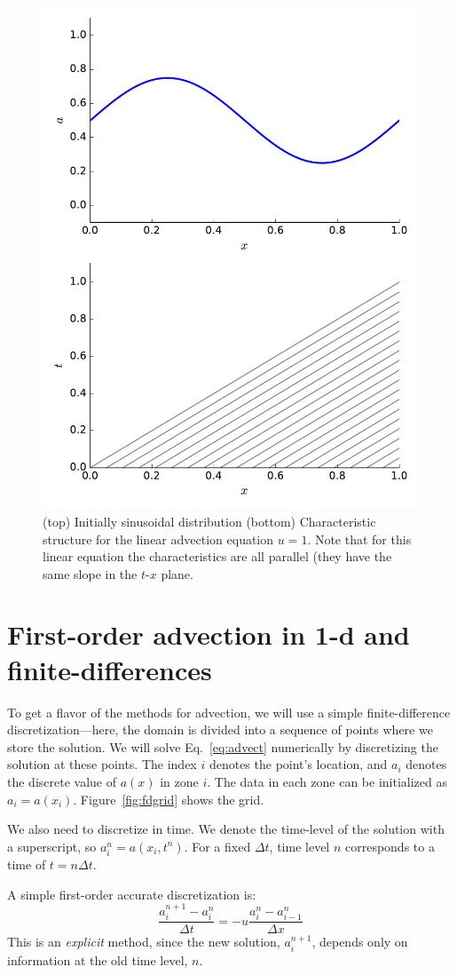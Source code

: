 \begin{figure}[t]
\centering
\includegraphics[width=0.6\linewidth]{advection-characteristics}
\caption[Characteristics for linear advection]
{\label{fig:advection_char} (top) Initially sinusoidal
distribution (bottom) Characteristic
structure for the linear advection equation $u = 1$.  Note
that for this linear equation the characteristics are all parallel
(they have the same slope in the $t$-$x$ plane.}
\end{figure}

\section{First-order advection in 1-d and finite-differences}

To get a flavor of the methods for advection, we will use a simple
finite-difference discretization---here, the domain is divided into
a sequence of points where we store the solution.
We will solve
Eq.~\ref{eq:advect} numerically by discretizing the solution at
these points.  The index $i$ denotes the point's location, and $a_i$
denotes the discrete value of $a(x)$ in zone $i$.  The data in each
zone can be initialized as $a_i = a(x_i)$.  Figure~\ref{fig:fdgrid}
shows the grid.

We also need to discretize in time.  We denote the time-level of the
solution with a superscript, so $a_i^n = a(x_i,t^n)$.  For a fixed
$\Delta t$, time level $n$ corresponds to a time of $t = n\Delta t$.


A simple first-order accurate discretization is:
\begin{equation}
\frac{a_i^{n+1} - a_i^n}{\Delta t} = - u \frac{a_i^n - a_{i-1}^n}{\Delta x}
\label{eq:fo}
\end{equation}
This is an {\em explicit} method, since the new solution, $a_i^{n+1}$,
depends only on information at the old time level, $n$.  


